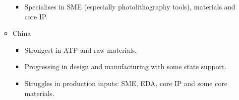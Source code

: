 \begin{itemize}
\begin{itemize}
        \begin{itemize}
            \item Specialises in SME (especially photolithography tools), materials and core IP.
        \end{itemize}
        \item China
        \begin{itemize}
            \item Strongest in ATP and raw materials.
            \item Progressing in design and manufacturing with some state support.
            \item Struggles in production inputs: SME, EDA, core IP and some core materials.
        \end{itemize}
    \end{itemize}
\end{itemize}